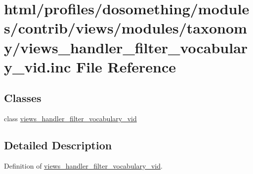 \hypertarget{views__handler__filter__vocabulary__vid_8inc}{
\section{html/profiles/dosomething/modules/contrib/views/modules/taxonomy/views\_\-handler\_\-filter\_\-vocabulary\_\-vid.inc File Reference}
\label{views__handler__filter__vocabulary__vid_8inc}
}
\subsection*{Classes}
\begin{DoxyCompactItemize}
\item 
class \hyperlink{classviews__handler__filter__vocabulary__vid}{views\_\-handler\_\-filter\_\-vocabulary\_\-vid}
\end{DoxyCompactItemize}


\subsection{Detailed Description}
Definition of \hyperlink{classviews__handler__filter__vocabulary__vid}{views\_\-handler\_\-filter\_\-vocabulary\_\-vid}. 